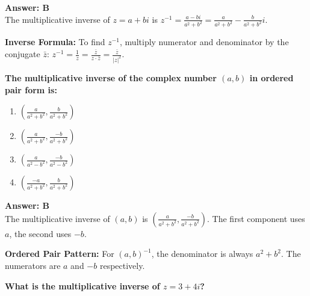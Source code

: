 \documentclass[12pt,a4paper]{article}
\begin{document}
\begin{answerstyle}
\textbf{Answer: B} \\
The multiplicative inverse of \( z = a + bi \) is \( z^{-1} = \frac{a - bi}{a^2 + b^2} = \frac{a}{a^2 + b^2} - \frac{b}{a^2 + b^2}i \).
\end{answerstyle}

\begin{conceptbox}
\textbf{Inverse Formula:} To find \( z^{-1} \), multiply numerator and denominator by the conjugate \( \bar{z} \): \( z^{-1} = \frac{1}{z} = \frac{\bar{z}}{z \cdot \bar{z}} = \frac{\bar{z}}{|z|^2} \).
\end{conceptbox}

\newpage
\begin{questiontitle}[MCQ 61]
\textbf{The multiplicative inverse of the complex number \( (a, b) \) in ordered pair form is:}
\end{questiontitle}

\begin{partbox}[Options]
\begin{enumerate}[label=\Alph*.]
    \item \( \left(\frac{a}{a^2 + b^2}, \frac{b}{a^2 + b^2}\right) \)
    \item \( \left(\frac{a}{a^2 + b^2}, \frac{-b}{a^2 + b^2}\right) \)
    \item \( \left(\frac{a}{a^2 - b^2}, \frac{-b}{a^2 - b^2}\right) \)
    \item \( \left(\frac{-a}{a^2 + b^2}, \frac{b}{a^2 + b^2}\right) \)
\end{enumerate}
\end{partbox}

\begin{answerstyle}
\textbf{Answer: B} \\
The multiplicative inverse of \( (a, b) \) is \( \left(\frac{a}{a^2 + b^2}, \frac{-b}{a^2 + b^2}\right) \). The first component uses \( a \), the second uses \( -b \).
\end{answerstyle}

\begin{conceptbox}
\textbf{Ordered Pair Pattern:} For \( (a, b)^{-1} \), the denominator is always \( a^2 + b^2 \). The numerators are \( a \) and \( -b \) respectively.
\end{conceptbox}

\newpage
\begin{questiontitle}[MCQ 62]
\textbf{What is the multiplicative inverse of \( z = 3 + 4i \)?}
\end{questiontitle}
\end{document}
